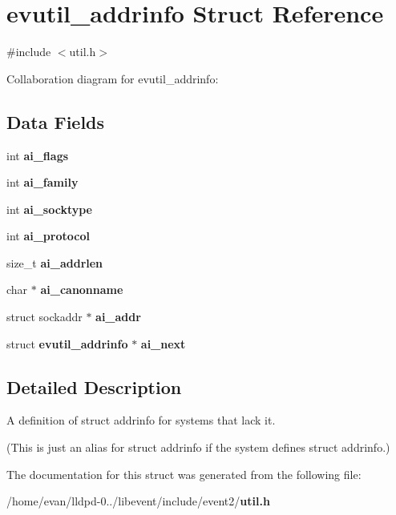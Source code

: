 \section{evutil\-\_\-addrinfo \-Struct \-Reference}
\label{structevutil__addrinfo}


{\ttfamily \#include $<$util.\-h$>$}



\-Collaboration diagram for evutil\-\_\-addrinfo\-:
\subsection*{\-Data \-Fields}
\begin{DoxyCompactItemize}
\item 
int {\bfseries ai\-\_\-flags}\label{structevutil__addrinfo_a92528a848ebf34ab99687dd06a09cc93}

\item 
int {\bfseries ai\-\_\-family}\label{structevutil__addrinfo_a4dc44d22f13bc5c59bff73e549e96a5c}

\item 
int {\bfseries ai\-\_\-socktype}\label{structevutil__addrinfo_a2109130e73586150c41fed16311e1af6}

\item 
int {\bfseries ai\-\_\-protocol}\label{structevutil__addrinfo_a6ade486587feaa03d492eb84cfc83451}

\item 
size\-\_\-t {\bfseries ai\-\_\-addrlen}\label{structevutil__addrinfo_a98d686f4346a14c118092536d61ecf8d}

\item 
char $\ast$ {\bfseries ai\-\_\-canonname}\label{structevutil__addrinfo_a9fcbdd64fcb9adcf195a78b10f1fe8f6}

\item 
struct sockaddr $\ast$ {\bfseries ai\-\_\-addr}\label{structevutil__addrinfo_a12798d0c9e56159c6e506eee1f7b9946}

\item 
struct {\bf evutil\-\_\-addrinfo} $\ast$ {\bfseries ai\-\_\-next}\label{structevutil__addrinfo_ab6bc67544cecf64e566ec1c2f3b2a5f7}

\end{DoxyCompactItemize}


\subsection{\-Detailed \-Description}
\-A definition of struct addrinfo for systems that lack it.

(\-This is just an alias for struct addrinfo if the system defines struct addrinfo.) 

\-The documentation for this struct was generated from the following file\-:\begin{DoxyCompactItemize}
\item 
/home/evan/lldpd-\/0../libevent/include/event2/{\bf util.\-h}\end{DoxyCompactItemize}
